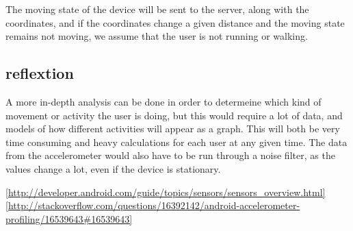 The moving state of the device will be sent to the server, along with the coordinates, and if the coordinates change a given distance and the moving state remains not moving, we assume that the user is not running or walking.

\subsection{reflextion}
A more in-depth analysis can be done in order to determeine which kind of movement or activity the user is doing, but this would require a lot of data, and models of how different activities will appear as a graph.
This will both be very time consuming and heavy calculations for each user at any given time. The data from the accelerometer would also have to be run through a noise filter, as the values change a lot, even if the device is stationary.



\ref{http://developer.android.com/guide/topics/sensors/sensors_overview.html}
\ref{http://stackoverflow.com/questions/16392142/android-accelerometer-profiling/16539643#16539643}